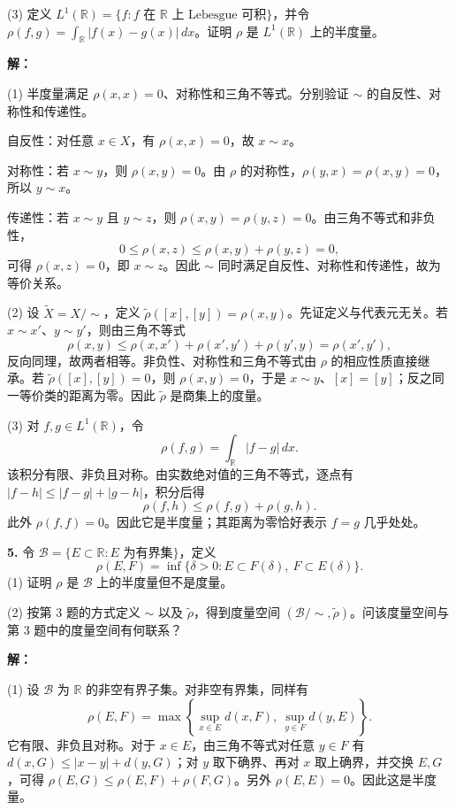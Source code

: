 \documentclass{article}
\begin{document}
(3) 定义 $L^1(\mathbb R)=\{f:f\text{ 在 }\mathbb R\text{ 上 Lebesgue 可积}\}$，并令 $\rho(f,g)=\int_{\mathbb R}|f(x)-g(x)|\,dx$。证明 $\rho$ 是 $L^1(\mathbb R)$ 上的半度量。

\textbf{解：}

(1) 半度量满足 $\rho(x,x)=0$、对称性和三角不等式。分别验证 $\sim$ 的自反性、对称性和传递性。

自反性：对任意 $x\in X$，有 $\rho(x,x)=0$，故 $x\sim x$。

对称性：若 $x\sim y$，则 $\rho(x,y)=0$。由 $\rho$ 的对称性，$\rho(y,x)=\rho(x,y)=0$，所以 $y\sim x$。

传递性：若 $x\sim y$ 且 $y\sim z$，则 $\rho(x,y)=\rho(y,z)=0$。由三角不等式和非负性，
\[
0\leq\rho(x,z)\leq\rho(x,y)+\rho(y,z)=0,
\]
可得 $\rho(x,z)=0$，即 $x\sim z$。因此 $\sim$ 同时满足自反性、对称性和传递性，故为等价关系。

(2) 设 $\widetilde X=X/{\sim}$，定义
\(\widetilde\rho([x],[y])=\rho(x,y)\)。先证定义与代表元无关。若 $x\sim x'$、$y\sim y'$，则由三角不等式
\[
\rho(x,y)\leq\rho(x,x')+\rho(x',y')+\rho(y',y)=\rho(x',y'),
\]
反向同理，故两者相等。非负性、对称性和三角不等式由 $\rho$ 的相应性质直接继承。若 $\widetilde\rho([x],[y])=0$，则 $\rho(x,y)=0$，于是 $x\sim y$、$[x]=[y]$；反之同一等价类的距离为零。因此 $\widetilde\rho$ 是商集上的度量。

(3) 对 $f,g\in L^1(\mathbb R)$，令
\[
\rho(f,g)=\int_{\mathbb R}|f-g|\,dx.
\]
该积分有限、非负且对称。由实数绝对值的三角不等式，逐点有
\(|f-h|\leq|f-g|+|g-h|\)，积分后得
\[
\rho(f,h)\leq\rho(f,g)+\rho(g,h).
\]
此外 $\rho(f,f)=0$。因此它是半度量；其距离为零恰好表示 $f=g$ 几乎处处。

\textbf{5.} 令 $\mathcal B=\{E\subset\mathbb R:E\text{ 为有界集}\}$，定义
\[
\rho(E,F)=\inf\{\delta>0:E\subset F(\delta),\ F\subset E(\delta)\}.
\]
(1) 证明 $\rho$ 是 $\mathcal B$ 上的半度量但不是度量。

(2) 按第 3 题的方式定义 $\sim$ 以及 $\widetilde\rho$，得到度量空间 $(\mathcal B/{\sim},\widetilde\rho)$。问该度量空间与第 3 题中的度量空间有何联系？

\textbf{解：}

(1) 设 $\mathcal B$ 为 $\mathbb R$ 的非空有界子集。对非空有界集，同样有
\[
\rho(E,F)=\max\left\{\sup_{x\in E}d(x,F),\ \sup_{y\in F}d(y,E)\right\}.
\tag{2}
\]
它有限、非负且对称。对于 $x\in E$，由三角不等式对任意 $y\in F$ 有 $d(x,G)\leq|x-y|+d(y,G)$；对 $y$ 取下确界、再对 $x$ 取上确界，并交换 $E,G$，可得
\(\rho(E,G)\leq\rho(E,F)+\rho(F,G)\)。另外 $\rho(E,E)=0$。因此这是半度量。
\end{document}
